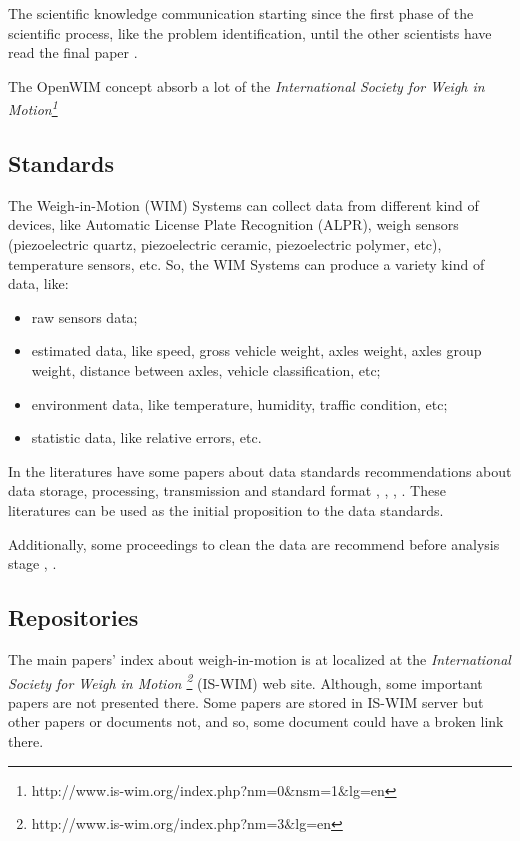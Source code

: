 \documentclass[a4paper]{article}
\begin{document}
{The scientific knowledge communication starting since the first phase of the scientific process, like the problem identification, until the other scientists have read the final paper \cite{leite2007scientific}.

The OpenWIM concept absorb a lot of the \textit{International Society for Weigh in Motion\footnote{http://www.is-wim.org/index.php?nm=0$\&$nsm=1$\&$lg=en}}

\subsection{Standards}\label{standards}

The Weigh-in-Motion (WIM) Systems can collect data from different kind of devices, like Automatic License Plate Recognition (ALPR), weigh sensors (piezoelectric quartz, piezoelectric ceramic, piezoelectric polymer, etc), temperature sensors, etc. So, the WIM Systems can produce a variety kind of data, like:

\begin{itemize}
\item raw sensors data;
\item estimated data, like speed, gross vehicle weight, axles weight, axles group weight, distance between axles, vehicle classification, etc;
\item environment data, like temperature, humidity, traffic condition, etc;
\item statistic data, like relative errors, etc.
\end{itemize}

In the literatures have some papers about data standards recommendations about data storage, processing, transmission and standard format \cite{tech:cost-323}, \cite{enright2011cleaning}, \cite{qu1997traffic}, \cite{elkins2008development}. These literatures can be used as the initial proposition to the data standards.

Additionally, some proceedings to clean the data are recommend before analysis stage \cite{elkins2008development}, \cite{enright2011cleaning}.


\subsection{Repositories}\label{repositories}

The main papers' index	about weigh-in-motion is at localized at the \textit{International Society for Weigh in Motion \footnote{http://www.is-wim.org/index.php?nm=3$\&$lg=en}} (IS-WIM) web site. Although, some important papers are not presented there. Some papers are stored in IS-WIM server but other papers or documents not, and so, some document could have a broken link there. 

}
\end{document}
